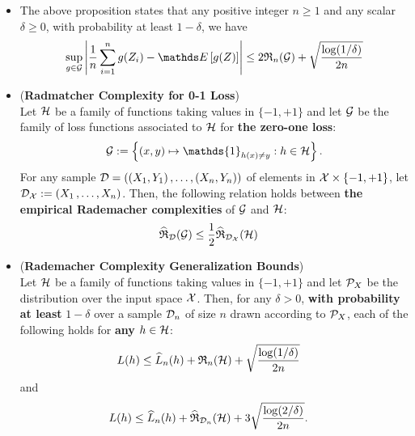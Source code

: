 \documentclass[11pt]{article}
\begin{document}
\begin{itemize}
\item \begin{remark}
The above proposition states that any positive integer $n \ge 1$ and any scalar $\delta \ge 0$, with probability at least $1 - \delta$, we have
\begin{align*}
\sup_{g \in \cG}\abs{\frac{1}{n}\sum_{i=1}^{n}g(Z_i)  - \E{}{g(Z)}} \le 2 \frR_{n}(\cG)  + \sqrt{\frac{\log(1 / \delta)}{2n}}
\end{align*}
\end{remark}

\item \begin{lemma} (\textbf{Radmatcher Complexity for 0-1 Loss}) \citep{mohri2018foundations}\\
Let ${\mathcal H}$ be a family of functions taking values in $\{-1, +1\}$ and let ${\mathcal G}$ be the family of loss functions associated to ${\mathcal H}$ for \textbf{the zero-one loss}: 
\begin{align*}
\cG := \set{(x,y) \mapsto \mathds{1}_{h(x) \neq y}:  h \in \cH}.
\end{align*}
For any sample ${\mathcal D} = ((X_1, Y_1) \,{,}\ldots{,}\, (X_n, Y_n))$ of elements in ${\mathcal X} \times \{-1, +1\}$, let ${\mathcal D}_{{\mathcal X}} := (X_1 \,{,}\ldots{,}\, X_n)$. Then, the following relation holds between \textbf{the empirical Rademacher complexities} of ${\mathcal G}$ and ${\mathcal H}$:
\begin{align*}
\widehat{{\mathfrak R}}_{{\mathcal D}}({\mathcal G}) &\le \frac{1}{2}\widehat{{\mathfrak R}}_{{\mathcal D}_{{\mathcal X}}}({\mathcal H})
\end{align*}
\end{lemma}

\item \begin{proposition} \label{prop: generalization_bound_radmatcher} (\textbf{Rademacher Complexity Generalization Bounds})\citep{mohri2018foundations}\\
Let ${\mathcal H}$ be a family of functions taking values in $\{-1, +1\}$  and let ${\mathcal P}_{X}$ be the distribution over the input space ${\mathcal X}$. Then, for any $\delta > 0$, \textbf{with probability at least} $1 - \delta$ over a sample ${\mathcal D}_{n}$ of size $n$ drawn according to ${\mathcal P}_{X}$, each of the following holds for \textbf{any} $h \in {\mathcal H}$:
\begin{align}
L(h) &\le \widehat{L}_{n}(h) + {\mathfrak R}_{n}({\mathcal H}) + \sqrt{\frac{\log(1 / \delta)}{2n}}  \label{eqn: radmatcher_binary_loss_bound_1}
\end{align} and
\begin{align}
L(h) &\le \widehat{L}_{n}(h) + \widehat{{\mathfrak R}}_{{\mathcal D}_{n}}({\mathcal H}) +  3\sqrt{\frac{\log(2 / \delta)}{2n}}.  \label{eqn: radmatcher_binary_loss_bound_2}
\end{align}
\end{proposition}


\end{itemize}
\end{document}
